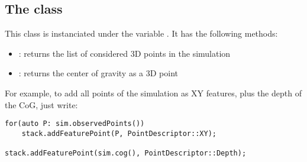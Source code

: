 \documentclass{ecnreport}
\begin{document}
\subsection{The  class}\label{app:sim}

This class is instanciated under the variable . It has the following methods:
\begin{itemize}
 \item {}: returns the list of considered 3D points in the simulation
 \item {}: returns the center of gravity as a 3D point
\end{itemize}

For example, to add all points of the simulation as XY features, plus the depth of the CoG, just write:

\begin{center}\cppstyle
\begin{lstlisting}
for(auto P: sim.observedPoints())
    stack.addFeaturePoint(P, PointDescriptor::XY);
    
stack.addFeaturePoint(sim.cog(), PointDescriptor::Depth);
\end{lstlisting}
\end{center}
\end{document}

